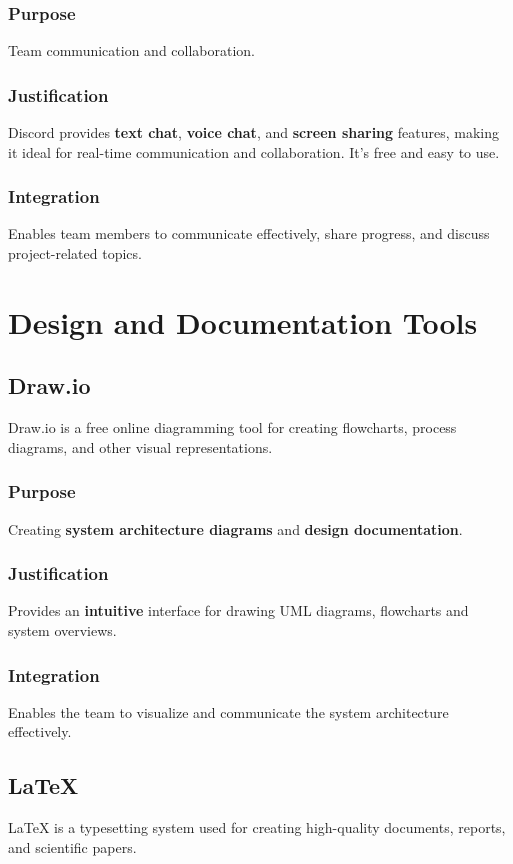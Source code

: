 \documentclass[a4paper, 11pt]{article}
\begin{document}
\subsubsection{Purpose}
Team communication and collaboration.

\subsubsection{Justification}
Discord provides \textbf{text chat}, \textbf{voice chat}, and \textbf{screen sharing} features, making it ideal for real-time communication and collaboration. It's free and easy to use.

\subsubsection{Integration}
Enables team members to communicate effectively, share progress, and discuss project-related topics.

\section{Design and Documentation Tools}

\subsection{Draw.io}
Draw.io is a free online diagramming tool for creating flowcharts, process diagrams, and other visual representations.

\subsubsection{Purpose}
Creating \textbf{system architecture diagrams} and \textbf{design documentation}.

\subsubsection{Justification}
Provides an \textbf{intuitive} interface for drawing UML diagrams, flowcharts and system overviews.

\subsubsection{Integration}
Enables the team to visualize and communicate the system architecture effectively.

\subsection{LaTeX}
LaTeX is a typesetting system used for creating high-quality documents, reports, and scientific papers.
\end{document}
